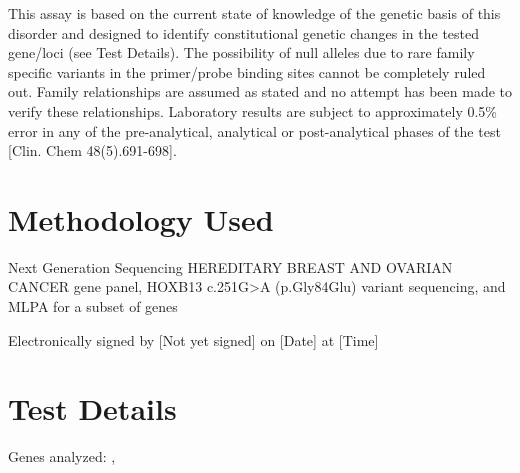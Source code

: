 \documentclass[9pt]{extarticle}
\newcommand{\data}[1]{}
\newenvironment{dataiter}[1]{}{}
\begin{document}
This assay is based on the current state of knowledge of the genetic basis of this disorder and designed to identify constitutional genetic changes in the tested gene/loci (see Test Details). The possibility of null alleles due to rare family specific variants in the primer/probe binding sites cannot be completely ruled out. Family relationships are assumed as stated and no attempt has been made to verify these relationships. Laboratory results are subject to approximately 0.5\% error in any of the pre-analytical, analytical or post-analytical phases of the test [Clin. Chem 48(5).691-698]. 

\section*{Methodology Used}
Next Generation Sequencing 
HEREDITARY BREAST AND OVARIAN CANCER \data{num_tested_genes} gene panel, HOXB13 c.251G>A (p.Gly84Glu) variant sequencing, and MLPA for a subset of genes 
\begin{flushright}
Electronically signed by [Not yet signed] on [Date] at [Time]
\end{flushright}

\section*{Test Details}
Genes analyzed: \begin{dataiter}{tested_genes}\data{gene_symbol}, \end{dataiter}
\end{document}
